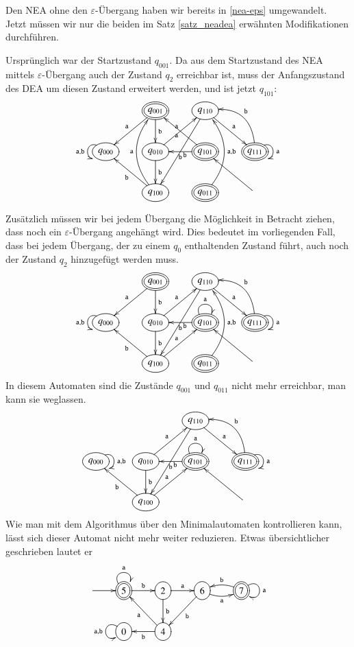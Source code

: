 Den NEA ohne den $\varepsilon$-Übergang haben wir bereits in
\ref{nea-eps} umgewandelt.
Jetzt müssen wir nur die beiden
im Satz \ref{satz_neadea} erwähnten Modifikationen durchführen.

Ursprünglich war der Startzustand $q_{001}$.
Da aus dem Startzustand
des NEA mittels $\varepsilon$-Übergang auch der Zustand $q_2$
erreichbar ist, muss der Anfangszustand des DEA um diesen Zustand
erweitert werden, und ist jetzt $q_{101}$:
\[
\entrymodifiers={++[o][F]}
\xymatrix{
*+\txt{}
	&*++[o][F=]{q_{001}} \ar[d]^{\tt b}\ar[dl]_{\tt a}
		&{q_{110}}\ar[dr]^{\tt a} \ar[ddl]^{\tt b}
\\
{q_{000}}\ar@(ul,dl)_{{\tt a},{\tt b}}
	&{q_{010}} \ar[ur]^{\tt a} \ar[d]^{\tt b}
		&*++[o][F=]{q_{101}} \ar[ul]^{\tt a} \ar[l]^{\tt b}
			&*++[o][F=]{q_{111}}\ar@(ur,dr)^{{\tt a}} \ar@/_20pt/[ul]_{\tt b}
\\
*+\txt{}
	&{q_{100}}\ar@/^20pt/[uu]^{\tt a} \ar[ul]^{\tt b}
		&*++[o][F=]{q_{011}} \ar@/_20pt/[uu]_{{\tt a},{\tt b}}
			&*+\txt{}\ar[ul]
}
\]


Zusätzlich müssen wir bei jedem Übergang die Möglichkeit in
Betracht ziehen, dass noch ein $\varepsilon$-Übergang angehängt
wird.
Dies bedeutet im vorliegenden Fall, dass bei jedem Übergang,
der zu einem $q_0$ enthaltenden Zustand führt, auch noch der
Zustand $q_2$ hinzugefügt werden muss.
\[
\entrymodifiers={++[o][F]}
\xymatrix{
*+\txt{}
	&*++[o][F=]{q_{001}} \ar[d]^{\tt b}\ar[dl]_{\tt a}
		&{q_{110}}\ar[dr]^{\tt a} \ar[ddl]^{\tt b}
\\
{q_{000}}\ar@(ul,dl)_{{\tt a},{\tt b}}
	&{q_{010}} \ar[ur]^{\tt a} \ar[d]^{\tt b}
		&*++[o][F=]{q_{101}} \ar@(ul,ur)^{\tt a} \ar[l]^{\tt b}
			&*++[o][F=]{q_{111}}\ar@(ur,dr)^{{\tt a}} \ar@/_20pt/[ul]_{\tt b}
\\
*+\txt{}
	&{q_{100}}\ar[ur]^{\tt a} \ar[ul]^{\tt b}
		&*++[o][F=]{q_{011}} \ar@/_20pt/[uu]_{{\tt a},{\tt b}}
			&*+\txt{}\ar[ul]
}
\]
In diesem Automaten sind die Zustände $q_{001}$ und $q_{011}$ nicht
mehr erreichbar, man kann sie weglassen.
\[
\entrymodifiers={++[o][F]}
\xymatrix{
*+\txt{}
	&*+\txt{}
		&{q_{110}}\ar[dr]^{\tt a} \ar[ddl]^{\tt b}
\\
{q_{000}}\ar@(ur,dr)^{{\tt a},{\tt b}}
	&{q_{010}} \ar[ur]^{\tt a} \ar[d]^{\tt b}
		&*++[o][F=]{q_{101}} \ar@(ul,ur)^{\tt a} \ar[l]^{\tt b}
			&*++[o][F=]{q_{111}}\ar@(ur,dr)^{{\tt a}} \ar@/_20pt/[ul]_{\tt b}
\\
*+\txt{}
	&{q_{100}}\ar[ur]^{\tt a} \ar[ul]^{\tt b}
		&*+\txt{}
			&*+\txt{}\ar[ul]
}
\]
Wie man mit dem Algorithmus über den Minimalautomaten kontrollieren
kann, lässt sich dieser Automat nicht mehr weiter reduzieren.
Etwas übersichtlicher geschrieben lautet er
\[
\entrymodifiers={++[o][F]}
\xymatrix{
*+\txt{}\ar[r]
	&*++[o][F=]{5}\ar@(ul,ur)^{\tt a} \ar[r]^{\tt b}
		&2\ar[r]^{\tt a} \ar[d]^{\tt b}
			&6\ar@/_/[r]_{\tt a} \ar[dl]^{\tt b}
				&*++[o][F=]{7}\ar@/_/[l]_{\tt b} \ar@(ur,dr)^{\tt a}
\\
*+\txt{}
	&0\ar@(ul,dl)_{{\tt a},{\tt b}}
		&4\ar[ul]^{\tt a} \ar[l]^{\tt b}
}
\]


